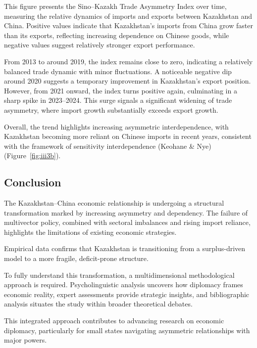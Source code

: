 \documentclass[12pt]{article}
\begin{document}
This figure presents the Sino--Kazakh Trade Asymmetry Index over time, measuring the relative dynamics of imports and exports between Kazakhstan and China. Positive values indicate that Kazakhstan’s imports from China grow faster than its exports, reflecting increasing dependence on Chinese goods, while negative values suggest relatively stronger export performance.\par
From 2013 to around 2019, the index remains close to zero, indicating a relatively balanced trade dynamic with minor fluctuations. A noticeable negative dip around 2020 suggests a temporary improvement in Kazakhstan’s export position. However, from 2021 onward, the index turns positive again, culminating in a sharp spike in 2023--2024. This surge signals a significant widening of trade asymmetry, where import growth substantially exceeds export growth.\par
Overall, the trend highlights increasing asymmetric interdependence, with Kazakhstan becoming more reliant on Chinese imports in recent years, consistent with the framework of sensitivity interdependence (Keohane \& Nye) (Figure~\ref{fig:iii3b}).\par










\subsection{Conclusion}
The Kazakhstan--China economic relationship is undergoing a structural transformation marked by increasing asymmetry and dependency. The failure of multivector policy, combined with sectoral imbalances and rising import reliance, highlights the limitations of existing economic strategies.\par
Empirical data confirms that Kazakhstan is transitioning from a surplus-driven model to a more fragile, deficit-prone structure.\par
To fully understand this transformation, a multidimensional methodological approach is required. Psycholinguistic analysis uncovers how diplomacy frames economic reality, expert assessments provide strategic insights, and bibliographic analysis situates the study within broader theoretical debates.\par
This integrated approach contributes to advancing research on economic diplomacy, particularly for small states navigating asymmetric relationships with major powers.\par
\end{document}
